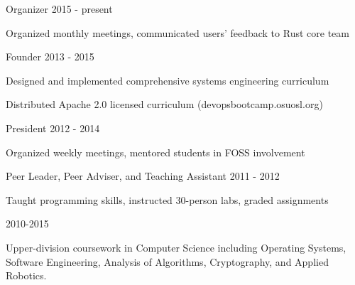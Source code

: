 \documentclass[11pt]{article} %
\begin{document}

\begin{description}
\squish
{}
           {Organizer}
           {2015 - present}

Organized monthly meetings, communicated users' feedback to Rust core team

           {Founder}
           {2013 - 2015}

Designed and implemented comprehensive systems engineering curriculum

Distributed Apache 2.0 licensed curriculum (devopsbootcamp.osuosl.org)

           {President}
           {2012 - 2014}

Organized weekly meetings, mentored students in FOSS involvement

           {Peer Leader, Peer Adviser, and Teaching Assistant}
           {2011 - 2012}

Taught \CPP programming skills, instructed 30-person labs, graded assignments

\end{description}


\begin{description}
\squish
{}
           {}
           {2010-2015}

Upper-division coursework in Computer Science including Operating Systems,\\
Software Engineering, Analysis of Algorithms, Cryptography, and Applied Robotics.

\end{description}

\end{document}
